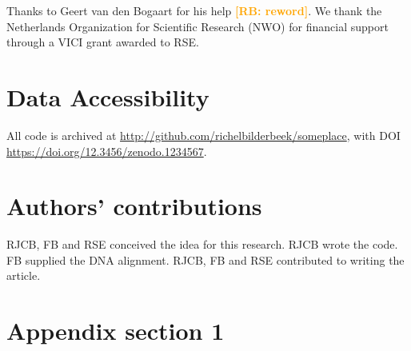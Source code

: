 \documentclass{article}
\newcommand{\richel}[1]{\textcolor{orange}{\textbf{[RB: #1]}}}
\begin{document}
Thanks to Geert van den Bogaart for his help \richel{reword}.
We thank the Netherlands 
Organization for Scientific Research (NWO) for financial support 
through a VICI grant awarded to RSE.

\section{Data Accessibility}

All code is archived at \url{http://github.com/richelbilderbeek/someplace},
with DOI \url{https://doi.org/12.3456/zenodo.1234567}.

\section{Authors' contributions}

RJCB, FB and RSE conceived the idea for this research. 
RJCB wrote the code.
FB supplied the DNA alignment.
RJCB, FB and RSE contributed to writing the article.




\appendix

\section{Appendix section 1}
\end{document}
